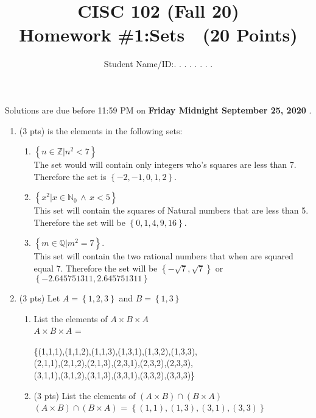 \documentclass[12pt]{article}
\title{CISC 102 (Fall 20)\\ Homework \#1:Sets $\;$   (20 Points) }
\author{Student Name/ID:. . . . . . . .}
\date{}
\newcommand{\set}[1]{\left\{ #1 \right\}}
\newcommand{\nn}{\ensuremath{\mathbb{N}}}
\newcommand{\qq}{\ensuremath{\mathbb{Q}}}
\newcommand{\zz}{\ensuremath{\mathbb{Z}}}
\begin{document}
\maketitle

\par\noindent Solutions are due before 11:59 PM on \textbf{Friday  Midnight September 25, 2020  }.


\begin{enumerate}


\item (3 pts) is the elements in the following sets:
\begin{enumerate}
	\item $\set{n\in\zz\vert n^2<7}$
    \\The set would will contain only integers who's squares are less than 7. Therefore the set is $\set{-2,-1,0,1,2}$.
    \\

	\item $\set{x^2\vert x\in\nn_0\, \wedge\, x<5}$
    \\This set will contain the squares of Natural numbers that are less than 5. Therefore the set will be $\set{0,1,4,9,16}$.


	\item $\set{m\in\qq\vert m^2=7} $.
    \\This set will contain the two rational numbers that when are squared equal 7. Therefore the set will be $\set{-\sqrt7,\sqrt7}$ or $\set{-2.645751311,2.645751311}$
	
\end{enumerate}

\item  (3 pts) Let $A = \set{1,2,3}$ and $B=\set{1,3}$
\begin{enumerate}
\item  List the elements of \(A \times B \times A\)
\\\(A \times B \times A\) =


\{(1,1,1),(1,1,2),(1,1,3),(1,3,1),(1,3,2),(1,3,3),
\\(2,1,1),(2,1,2),(2,1,3),(2,3,1),(2,3,2),(2,3,3),
\\(3,1,1),(3,1,2),(3,1,3),(3,3,1),(3,3,2),(3,3,3)\}
\\

\item (3 pts) List the elements of \((A \times B) \cap (B \times A)\)
\\\((A \times B) \cap (B \times A)\) = $\set{(1,1),(1,3),(3,1),(3,3)}$
\\


\end{enumerate}
\end{enumerate}
\end{document}
